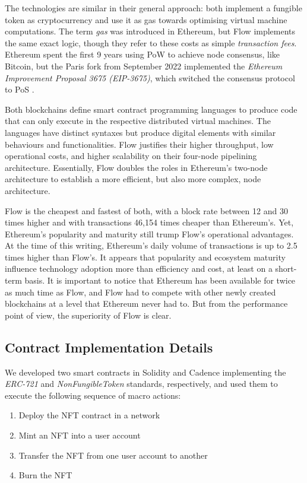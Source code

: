 \documentclass[../NFTComp_IEEE.tex]{subfiles}
\begin{document}
The technologies are similar in their general approach: both implement a fungible token as cryptocurrency and use it as gas towards optimising virtual machine computations. The term \textit{gas} was introduced in Ethereum, but Flow implements the same exact logic, though they refer to these costs as simple \textit{transaction fees}. Ethereum spent the first 9 years using PoW to achieve node consensus, like Bitcoin, but the Paris fork from September 2022 implemented the \textit{Ethereum Improvement Proposal 3675 (EIP-3675)}, which switched the consensus protocol to PoS \cite{EIP3675}.
\par
Both blockchains define smart contract programming languages to produce code that can only execute in the respective distributed virtual machines. The languages have distinct syntaxes but produce digital elements with similar behaviours and functionalities. Flow justifies their higher throughput, low operational costs, and higher scalability on their four-node pipelining architecture. Essentially, Flow doubles the roles in Ethereum's two-node architecture to establish a more efficient, but also more complex, node architecture.
\par
Flow is the cheapest and fastest of both, with a block rate between 12 and 30 times higher and with transactions 46,154 times cheaper than Ethereum's. Yet, Ethereum's popularity and maturity still trump Flow's operational advantages. At the time of this writing, Ethereum's daily volume of transactions is up to 2.5 times higher than Flow's. It appears that popularity and ecosystem maturity influence technology adoption more than efficiency and cost, at least on a short-term basis. It is important to notice that Ethereum has been available for twice as much time as Flow, and Flow had to compete with other newly created blockchains at a level that Ethereum never had to. But from the performance point of view, the superiority of Flow is clear.

\subsection{Contract Implementation Details}

We developed two smart contracts in Solidity and Cadence implementing the \textit{ERC-721} and \textit{NonFungibleToken} standards, respectively, and used them to execute the following sequence of macro actions:

\begin{enumerate}
    \item {Deploy the NFT contract in a network}
    \item {Mint an NFT into a user account}
    \item {Transfer the NFT from one user account to another}
    \item {Burn the NFT}
\end{enumerate}
\end{document}
